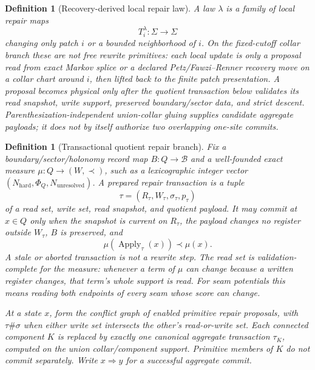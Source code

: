 \documentclass[11pt]{article}
\newtheorem{definition}[theorem]{Definition}
\begin{document}
\begin{definition}[Recovery-derived local repair law]
A law $\lambda$ is a family of local repair maps
\[
T_i^\lambda:\Sigma\to\Sigma
\]
changing only patch $i$ or a bounded neighborhood of $i$. On the fixed-cutoff collar branch these
are not free rewrite primitives: each local update is only a proposal read from exact Markov splice
or a declared Petz/Fawzi--Renner recovery move on a collar chart around \(i\), then lifted back to
the finite patch presentation. A proposal becomes physical only after the quotient transaction
below validates its read snapshot, write support, preserved boundary/sector data, and strict
descent. Parenthesization-independent union-collar gluing supplies candidate aggregate payloads;
it does not by itself authorize two overlapping one-site commits.
\end{definition}

\begin{definition}[Transactional quotient repair branch]\label{def:transactional-quotient-repair}
Fix a boundary/sector/holonomy record map \(B:Q\to\mathcal B\) and a well-founded exact measure
\(\mu:Q\to(W,\prec)\), such as a lexicographic integer vector
\((N_{\mathrm{hard}},\Phi_Q,N_{\mathrm{unresolved}})\). A prepared repair transaction is a tuple
\[
\tau=(R_\tau,W_\tau,\sigma_\tau,p_\tau)
\]
of a read set, write set, read snapshot, and quotient payload. It may commit at \(x\in Q\) only
when the snapshot is current on \(R_\tau\), the payload changes no register outside \(W_\tau\),
\(B\) is preserved, and
\[
\mu(\operatorname{Apply}_\tau(x))\prec\mu(x).
\]
A stale or aborted transaction is not a rewrite step. The read set is validation-complete for the
measure: whenever a term of \(\mu\) can change because a written register changes, that term's
whole support is read. For seam potentials this means reading both endpoints of every seam whose
score can change.

At a state \(x\), form the conflict graph of enabled primitive repair proposals, with
\(\tau\#\sigma\) when either write set intersects the other's read-or-write set. Each connected
component \(K\) is replaced by exactly one canonical aggregate transaction \(\tau_K\), computed on
the union collar/component support. Primitive members of \(K\) do not commit separately. Write
\(x\Rightarrow y\) for a successful aggregate commit.
\end{definition}
\end{document}
